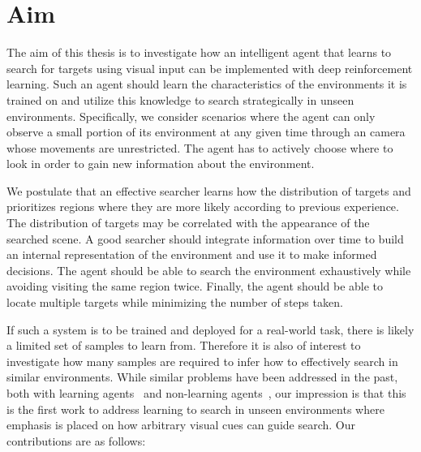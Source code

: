 \section{Aim}
\label{sec:aim}

The aim of this thesis is to investigate how an intelligent agent that learns to search for targets using visual input can be implemented with deep reinforcement learning.
Such an agent should learn the characteristics of the environments it is trained on and utilize this knowledge to search strategically in unseen environments.
Specifically, we consider scenarios where the agent can only observe a small portion of its environment at any given time through an camera whose movements are unrestricted.
The agent has to actively choose where to look in order to gain new information about the environment.

We postulate that an effective searcher learns how the distribution of targets and prioritizes regions where they are more likely according to previous experience.
The distribution of targets may be correlated with the appearance of the searched scene.
A good searcher should integrate information over time to build an internal representation of the environment and use it to make informed decisions.
The agent should be able to search the environment exhaustively while avoiding visiting the same region twice.
Finally, the agent should be able to locate multiple targets while minimizing the number of steps taken.

If such a system is to be trained and deployed for a real-world task, there is likely a limited set of samples to learn from.
Therefore it is also of interest to investigate how many samples are required to infer how to effectively search in similar environments.
While similar problems have been addressed in the past, both with learning agents~\cite{minut_reinforcement_2001,mirowski_learning_2017,ourselin_artificial_2016,caicedo_active_2015} and non-learning agents~\cite{shubina_visual_2010,forssen_informed_2008}, 
our impression is that this is the first work to address learning to search in unseen environments where emphasis is placed on how arbitrary visual cues can guide search.
Our contributions are as follows:

